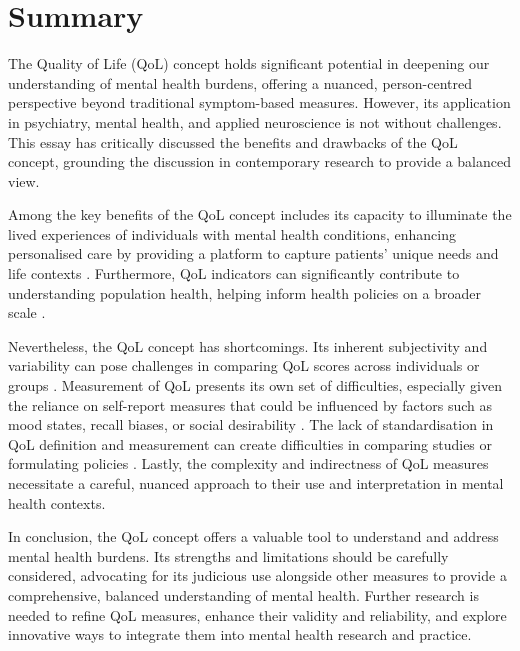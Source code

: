 \documentclass[10pt]{article}
\begin{document}
\begin{sloppypar}
  \section{Summary}
  \label{sec:summary}

  The Quality of Life (QoL) concept holds significant potential in deepening our understanding of mental health burdens, offering a nuanced, person-centred perspective beyond traditional symptom-based measures. However, its application in psychiatry, mental health, and applied neuroscience is not without challenges. This essay has critically discussed the benefits and drawbacks of the QoL concept, grounding the discussion in contemporary research to provide a balanced view.

  Among the key benefits of the QoL concept includes its capacity to illuminate the lived experiences of individuals with mental health conditions, enhancing personalised care by providing a platform to capture patients' unique needs and life contexts
  \citep{dwamena_interventions_2012,endicott_quality_1993}. Furthermore, QoL indicators can significantly contribute to understanding population health, helping inform health policies on a broader scale
  \citep{gbd_2017_disease_and_injury_incidence_and_prevalence_collaborators_global_2018}.

  Nevertheless, the QoL concept has shortcomings. Its inherent subjectivity and variability can pose challenges in comparing QoL scores across individuals or groups \citep{skevington_expecting_2012}. Measurement of QoL presents its own set of difficulties, especially given the reliance on self-report measures that could be influenced by factors such as mood states, recall biases, or social desirability \citep{bowling_just_2005}. The lack of standardisation in QoL definition and measurement can create difficulties in comparing studies or formulating policies \citep{matarazzo_behavioral_1980}. Lastly, the complexity and indirectness of QoL measures necessitate a careful, nuanced approach to their use and interpretation in mental health contexts.

  In conclusion, the QoL concept offers a valuable tool to understand and address mental health burdens. Its strengths and limitations should be carefully considered, advocating for its judicious use alongside other measures to provide a comprehensive, balanced understanding of mental health. Further research is needed to refine QoL measures, enhance their validity and reliability, and explore innovative ways to integrate them into mental health research and practice.

  \pagebreak
  \singlespacing %
  
  

\end{sloppypar}
\end{document}
